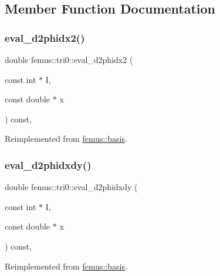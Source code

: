 \subsection{Member Function Documentation}
\mbox{\label{classfemus_1_1tri0_ae832dd28eb7437215ce49ce0bac98ba3}} 
\subsubsection{\texorpdfstring{eval\+\_\+d2phidx2()}{eval\_d2phidx2()}}
{\footnotesize\ttfamily double femus\+::tri0\+::eval\+\_\+d2phidx2 (\begin{DoxyParamCaption}\item[{const int $\ast$}]{I,  }\item[{const double $\ast$}]{x }\end{DoxyParamCaption}) const\hspace{0.3cm}{\ttfamily [inline]}, {\ttfamily [virtual]}}



Reimplemented from \mbox{\hyperlink{classfemus_1_1basis_a0a9839e75d1c9c8302486fc072eed028}{femus\+::basis}}.

\mbox{\label{classfemus_1_1tri0_af109d0128644bcac07a88dfba1f457b4}} 
\subsubsection{\texorpdfstring{eval\+\_\+d2phidxdy()}{eval\_d2phidxdy()}}
{\footnotesize\ttfamily double femus\+::tri0\+::eval\+\_\+d2phidxdy (\begin{DoxyParamCaption}\item[{const int $\ast$}]{I,  }\item[{const double $\ast$}]{x }\end{DoxyParamCaption}) const\hspace{0.3cm}{\ttfamily [inline]}, {\ttfamily [virtual]}}



Reimplemented from \mbox{\hyperlink{classfemus_1_1basis_ac9feaf9e60421143db2a3708f3c7fa48}{femus\+::basis}}.

